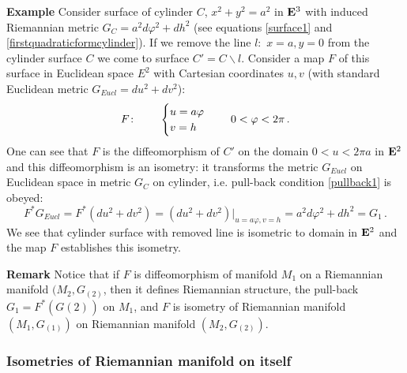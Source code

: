 \documentclass[12pt]{article}
\theoremstyle{theorem}
\numberwithin{equation}{section}
\begin{document}
\m



{\bf Example} Consider surface of cylinder
$C$, $x^2+y^2=a^2$ in ${\bf E}^3$
with induced Riemannian metric
 $G_{C}=a^2 d\varphi^2+dh^2$ (see equations
\eqref{surface1} and \eqref{firstquadraticformcylinder}).
If we remove the line $l\colon\,\,x=a,y=0$
from the cylinder surface $C$ we come to
surface $C'=C\backslash l$.
Consider a map $F$ of this surface
in Euclidean space $E^2$ with Cartesian coordinates $u,v$
(with standard Euclidean metric $G_{Eucl}=du^2+dv^2$):
         \begin{equation}\label{diffofcylinderondomain}
        F\colon\qquad
        \begin{cases}
           u=a\varphi\cr
           v=h\cr
          \end{cases}\,\quad 0<\varphi < 2\pi\,.
           \end{equation}
One can see that $F$ is the diffeomorphism  of $C'$ on the domain
$0<u<2\pi a$ in ${\bf E}^2$ and this diffeomorphism is an isometry:
 it transforms the metric
$G_{Eucl}$ on Euclidean space  in metric $G_{C}$ on cylinder, i.e.
pull-back condition \eqref{pullback1} is obeyed:
       $$
    F^*G_{Eucl}=F^*\left(du^2+dv^2\right)=
    \left(du^2+dv^2\right)\big\vert_{u=a\varphi,v=h}=
     a^2d\varphi^2+dh^2=G_1\,.
       $$
We see that cylinder surface with removed line is isometric to domain
in ${\bf E}^2$ and the map $F$ establishes this isometry.

{\footnotesize
{\bf Remark} Notice that
if  $F$ is diffeomorphism of manifold $M_1$
on a Riemannian manifold $(M_2,G_{(2)}$, 
then  it defines Riemannian structure,
the pull-back $G_{1}=F^*(G(2)_{})$ on $M_1$,
and   $F$ is isometry of Riemannian manifold
 $(M_1,G_{(1)})$
on Riemannian manifold $(M_2,G_{(2)})$.
}

\subsubsection {Isometries of Riemannian manifold on itself}
  
\end{document}
